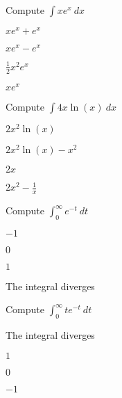 \begin{readinessAssuranceTest}
\setcounter{enumi}{40}

\item Compute \(\int xe^{x}\ dx \)
\begin{multicols}{4}
\begin{readinessAssuranceTestChoices}
\item \(xe^x+e^x\)
\item \(xe^x-e^x\) %
\item \(\frac{1}{2}x^2 e^x\)
\item \(xe^x\)
\end{readinessAssuranceTestChoices}
\end{multicols}
\vfill




\item Compute \(\int 4 x \ln(x)\ dx\)
\begin{multicols}{4}
\begin{readinessAssuranceTestChoices}
\item \(2x^2 \ln(x)\)
\item \(2x^2 \ln(x)-x^2\) %
\item \(2x\)
\item \(2x^2-\frac{1}{x}\)
\end{readinessAssuranceTestChoices}
\end{multicols}
\vfill

\item Compute \(\int _0 ^{\infty} e^{-t}\ dt\)
\begin{multicols}{2}
\begin{readinessAssuranceTestChoices}
\item \(-1\)
\item \(0\)
\item \(1\) %
\item The integral diverges
\end{readinessAssuranceTestChoices}
\end{multicols}
\vfill


\item Compute \(\int _0 ^{\infty} te^{-t}\ dt\)
\begin{multicols}{2}
\begin{readinessAssuranceTestChoices}
\item The integral diverges
\item \(1\) %
\item \(0\)
\item \(-1\)
\end{readinessAssuranceTestChoices}
\end{multicols}
\vfill



\end{readinessAssuranceTest}
